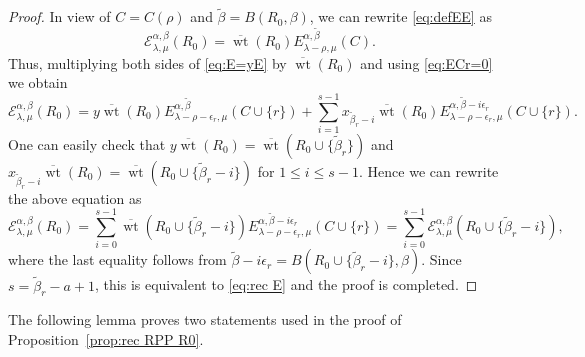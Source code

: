 \documentclass[12pt]{amsart}
\numberwithin{equation}{section}
\theoremstyle{definition}
\newcommand\wb{\widetilde{\beta}}
\newcommand\wt{\operatorname{wt}}
\newcommand\EE{\mathcal{E}}
\newcommand\owt{\overline{\wt}}
\begin{document}
\begin{proof}
In view of $C=C(\rho)$ and $\wb=B(R_0,\beta)$,
we can rewrite \eqref{eq:defEE} as
  \[
  \EE_{\lambda,\mu}^{\alpha,\beta}(R_0) = \owt(R_0)
  E_{\lambda-\rho,\mu}^{\alpha,\wb}(C).
\]
Thus, multiplying both sides of \eqref{eq:E=yE} by
$\owt(R_0)$ and using \eqref{eq:ECr=0} we obtain
\[
  \EE^{\alpha,\beta}_{\lambda,\mu}(R_0) = y\owt(R_0)
  E^{\alpha,\wb}_{\lambda-\rho-\epsilon_r,\mu}(C\cup\{r\}) + \sum_{i=1}^{s-1}
  x_{\wb_r-i} \owt(R_0) E_{\lambda-\rho-\epsilon_r,\mu}^{\alpha,\wb-i\epsilon_r}(C\cup\{r\}).
  \]
  One can easily check that $y\owt(R_0) = \owt(R_0\cup\{\wb_r\})$ and
  $x_{\wb_r-i} \owt(R_0)=\owt(R_0\cup\{\wb_r-i\})$ for $1\le i\le s-1$. Hence we
  can rewrite the above equation as
\[
  \EE^{\alpha,\beta}_{\lambda,\mu}(R_0) =\sum_{i=0}^{s-1}
  \owt(R_0\cup\{\wb_r-i\})
  E_{\lambda-\rho-\epsilon_r,\mu}^{\alpha,\wb-i\epsilon_r}(C\cup\{r\})
  = \sum_{i=0}^{s-1} \EE^{\alpha,\beta}_{\lambda,\mu}(R_0\cup\{\wb_r-i\}),
\]
where the last equality follows from $\wb-i\epsilon_r =
B(R_0\cup\{\wb_r-i\},\beta)$.
Since $s = \wb_r - a + 1$, this is equivalent to \eqref{eq:rec E} and the
proof is completed.
\end{proof}

The following lemma proves two statements used in the proof of
Proposition~\ref{prop:rec RPP R0}.
\end{document}
